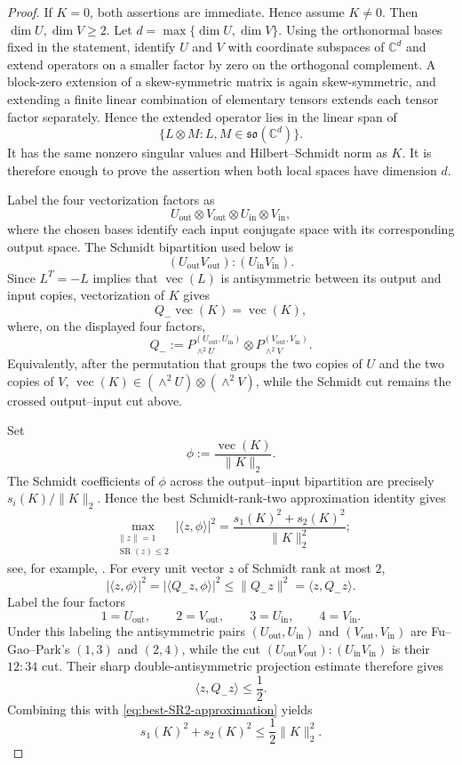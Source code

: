 \documentclass[11pt,reqno]{amsart}
\theoremstyle{remark}
\DeclareMathOperator{\SR}{SR}
\newcommand{\ip}[2]{\langle #1,#2\rangle}
\newcommand{\norm}[1]{\lVert #1\rVert}
\newcommand{\abs}[1]{\lvert #1\rvert}
\newcommand{\C}{\mathbb C}
\begin{document}
\begin{proof}
If $K=0$, both assertions are immediate. Hence assume $K\ne0$. Then
$\dim U,\dim V\ge2$. Let $d=\max\{\dim U,\dim V\}$.  Using the
orthonormal bases fixed in the statement, identify $U$ and $V$ with
coordinate subspaces of $\C^d$ and extend operators on a smaller
factor by zero on the orthogonal complement.  A block-zero extension
of a skew-symmetric matrix is again skew-symmetric, and extending a
finite linear combination of elementary tensors extends each tensor
factor separately.  Hence the extended operator lies in the linear
span of
\[
    \{L\otimes M:
      L,M\in\mathfrak{so}(\C^d)\}.
\]
It has the same nonzero singular values and Hilbert--Schmidt norm as
$K$.  It is therefore enough to prove the assertion when both local
spaces have dimension $d$.

Label the four vectorization factors as
\[
    U_{\mathrm{out}}\otimes V_{\mathrm{out}}
    \otimes U_{\mathrm{in}}\otimes V_{\mathrm{in}},
\]
where the chosen bases identify each input conjugate space with its
corresponding output space. The Schmidt bipartition used below is
\[
    (U_{\mathrm{out}}V_{\mathrm{out}})
    :
    (U_{\mathrm{in}}V_{\mathrm{in}}).
\]
Since $L^T=-L$ implies that $\operatorname{vec}(L)$ is antisymmetric
between its output and input copies, vectorization of $K$ gives
\[
    Q_-\operatorname{vec}(K)=\operatorname{vec}(K),
\]
where, on the displayed four factors,
\[
    Q_-
    :=P_{\wedge^2 U}^{(U_{\mathrm{out}},U_{\mathrm{in}})}
      \otimes
      P_{\wedge^2 V}^{(V_{\mathrm{out}},V_{\mathrm{in}})}.
\]
Equivalently, after the permutation that groups the two copies of $U$
and the two copies of $V$,
$\operatorname{vec}(K)\in(\wedge^2U)\otimes(\wedge^2V)$, while the
Schmidt cut remains the crossed output--input cut above.

Set
\[
    \phi:=\frac{\operatorname{vec}(K)}{\norm{K}_2}.
\]
The Schmidt coefficients of $\phi$ across the output--input
bipartition are precisely $s_i(K)/\norm{K}_2$. Hence the best
Schmidt-rank-two approximation identity gives
\begin{equation}
\label{eq:best-SR2-approximation}
    \max_{\substack{\norm{z}=1\\ \SR(z)\le2}}
    \abs{\ip{z}{\phi}}^2
    =
    \frac{s_1(K)^2+s_2(K)^2}{\norm{K}_2^2};
\end{equation}
see, for example, \cite[Theorem 3.3]{JohnstonKribs2010}.
For every unit vector $z$ of Schmidt rank at most $2$,
\[
    \abs{\ip{z}{\phi}}^2
    =\abs{\ip{Q_-z}{\phi}}^2
    \le \norm{Q_-z}^2
    =\ip{z}{Q_-z}.
\]
Label the four factors
\[
    1=U_{\mathrm{out}},\qquad
    2=V_{\mathrm{out}},\qquad
    3=U_{\mathrm{in}},\qquad
    4=V_{\mathrm{in}}.
\]
Under this labeling the antisymmetric pairs
$(U_{\mathrm{out}},U_{\mathrm{in}})$ and
$(V_{\mathrm{out}},V_{\mathrm{in}})$ are Fu--Gao--Park's $(1,3)$
and $(2,4)$, while the cut
$(U_{\mathrm{out}}V_{\mathrm{out}}):(U_{\mathrm{in}}V_{\mathrm{in}})$
is their $12{:}34$ cut.  Their sharp double-antisymmetric projection
estimate \cite[Theorem 2.4]{fu2026solution2copydistillabilitywerner}
therefore gives
\[
    \ip{z}{Q_-z}\le\frac12.
\]
Combining this with \cref{eq:best-SR2-approximation} yields
\[
    s_1(K)^2+s_2(K)^2\le\frac12\norm{K}_2^2.
\]


\end{proof}
\end{document}
